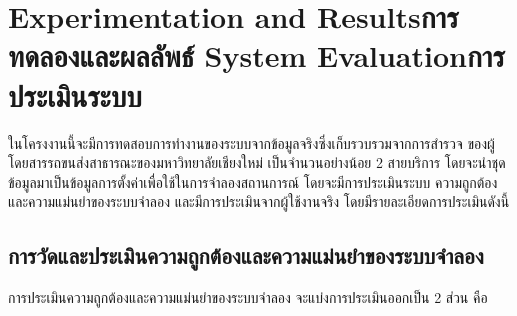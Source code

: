 \chapter{\ifproject%
\ifenglish Experimentation and Results\else การทดลองและผลลัพธ์\fi
\else%
\ifenglish System Evaluation\else การประเมินระบบ\fi
\fi}
\begin{mypara}
    \indent ในโครงงานนี้จะมีการทดสอบการทำงานของระบบจากข้อมูลจริงซึ่งเก็บรวบรวมจากการสำรวจ
    ของผู้โดยสารรถขนส่งสาธารณะของมหาวิทยาลัยเชียงใหม่ เป็นจำนวนอย่างน้อย 2 สายบริการ 
    โดยจะนำชุดข้อมูลมาเป็นข้อมูลการตั้งค่าเพื่อใช้ในการจำลองสถานการณ์ โดยจะมีการประเมินระบบ 
    ความถูกต้องและความแม่นยำของระบบจำลอง และมีการประเมินจากผู้ใช้งานจริง 
    โดยมีรายละเอียดการประเมินดังนี้
\end{mypara}


\section{การวัดและประเมินความถูกต้องและความแม่นยำของระบบจำลอง}
\begin{mypara}
    \indent การประเมินความถูกต้องและความแม่นยำของระบบจำลอง จะแบ่งการประเมินออกเป็น 2 ส่วน คือ
\end{mypara}
